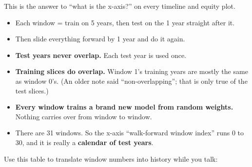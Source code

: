 \documentclass[11pt,a4paper]{article}
\begin{document}
This is the answer to ``what is the x-axis?'' on every timeline and equity plot.

\begin{center}
\end{center}

\begin{itemize}
  \item Each window = train on 5 years, then test on the 1 year straight after it.
  \item Then slide everything forward by 1 year and do it again.
  \item \textbf{Test years never overlap.} Each test year is used once.
  \item \textbf{Training slices do overlap.} Window 1's training years are mostly the same as
        window 0's. (An older note said ``non-overlapping''; that is only true of the test
        slices.)
  \item \textbf{Every window trains a brand new model from random weights.} Nothing carries
        over from window to window.
  \item There are 31 windows. So the x-axis ``walk-forward window index'' runs 0 to 30, and
        it is really a \textbf{calendar of test years}.
\end{itemize}

Use this table to translate window numbers into history while you talk:
\end{document}
